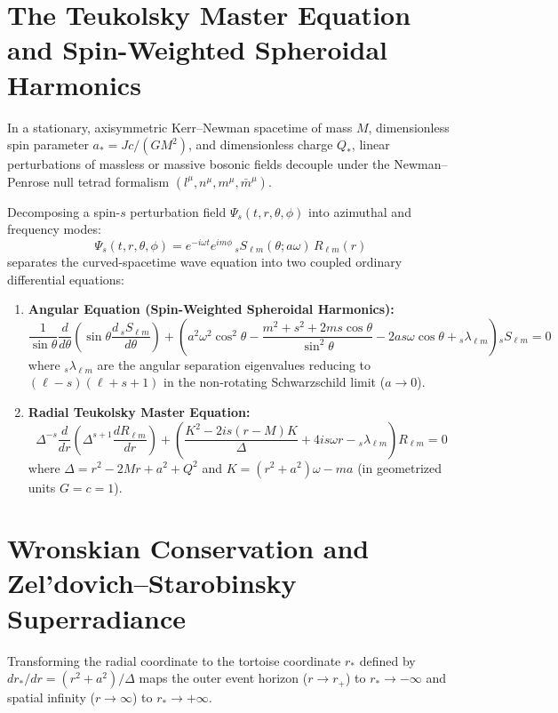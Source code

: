 \documentclass[11pt,a4paper]{article}
\begin{document}
\section{The Teukolsky Master Equation and Spin-Weighted Spheroidal Harmonics}
In a stationary, axisymmetric Kerr--Newman spacetime of mass $M$, dimensionless spin parameter $a_* = Jc / (GM^2)$, and dimensionless charge $Q_*$, linear perturbations of massless or massive bosonic fields decouple under the Newman--Penrose null tetrad formalism $(l^\mu, n^\mu, m^\mu, \bar{m}^\mu)$.

Decomposing a spin-$s$ perturbation field $\Psi_s(t, r, \theta, \phi)$ into azimuthal and frequency modes:
\begin{equation}
\Psi_s(t, r, \theta, \phi) = e^{-i\omega t} e^{i m \phi} \, {}_s S_{\ell m}(\theta; a\omega) \, R_{\ell m}(r)
\end{equation}
separates the curved-spacetime wave equation into two coupled ordinary differential equations:
\begin{enumerate}
\item \textbf{Angular Equation (Spin-Weighted Spheroidal Harmonics):}
\begin{equation}
\frac{1}{\sin\theta}\frac{d}{d\theta}\left(\sin\theta \frac{d\,{}_s S_{\ell m}}{d\theta}\right) + \left(a^2 \omega^2 \cos^2\theta - \frac{m^2 + s^2 + 2ms\cos\theta}{\sin^2\theta} - 2as\omega\cos\theta + {}_s\lambda_{\ell m}\right){}_s S_{\ell m} = 0
\end{equation}
where ${}_s\lambda_{\ell m}$ are the angular separation eigenvalues reducing to $(\ell - s)(\ell + s + 1)$ in the non-rotating Schwarzschild limit ($a \to 0$).
\item \textbf{Radial Teukolsky Master Equation:}
\begin{equation}
\Delta^{-s}\frac{d}{dr}\left(\Delta^{s+1}\frac{dR_{\ell m}}{dr}\right) + \left(\frac{K^2 - 2is(r - M)K}{\Delta} + 4is\omega r - {}_s\lambda_{\ell m}\right)R_{\ell m} = 0
\end{equation}
where $\Delta = r^2 - 2Mr + a^2 + Q^2$ and $K = (r^2 + a^2)\omega - m a$ (in geometrized units $G = c = 1$).
\end{enumerate}

\section{Wronskian Conservation and Zel'dovich--Starobinsky Superradiance}
Transforming the radial coordinate to the tortoise coordinate $r_*$ defined by $dr_* / dr = (r^2 + a^2) / \Delta$ maps the outer event horizon ($r \to r_+$) to $r_* \to -\infty$ and spatial infinity ($r \to \infty$) to $r_* \to +\infty$.
\end{document}
